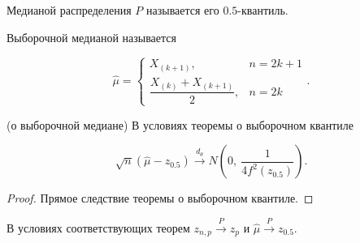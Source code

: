 \begin{definition}
    Медианой распределения $\displaystyle P$ называется его $\displaystyle 0.5$-квантиль.
    \end{definition}
    \begin{definition}
    Выборочной медианой называется
    
    
    \begin{equation*}
    \hat{\mu } =\begin{cases}
    X_{( k+1)} , & n=2k+1\\
    \dfrac{X_{( k)} +X_{( k+1)}}{2} , & n=2k
    \end{cases} .
    \end{equation*}
    \end{definition}
    \begin{theorem}
    (о выборочной медиане) В условиях теоремы о выборочном квантиле
    
    
    \begin{equation*}
    \sqrt{n}(\hat{\mu } -z_{0.5})\xrightarrow{d_{\theta }} N\left( 0,\ \frac{1}{4f^{2}( z_{0.5})}\right) .
    \end{equation*}
    \end{theorem}
    \begin{proof}
    Прямое следствие теоремы о выборочном квантиле.
    \end{proof}
    \begin{note}
    В условиях соответствующих теорем $\displaystyle z_{n,p}\xrightarrow{P} z_{p}$ и $\displaystyle \hat{\mu }\xrightarrow{P} z_{0.5}$.
    \end{note}
